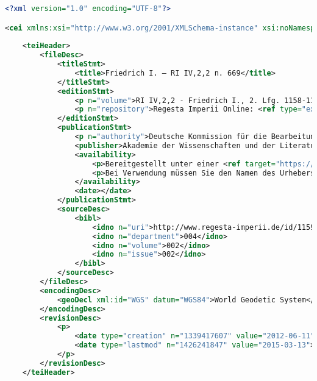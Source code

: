 \label{annexe:CEI_schema}

\lstset{style=mystyle}
\begin{lstlisting}[language=XML]
<?xml version="1.0" encoding="UTF-8"?>

<cei xmlns:xsi="http://www.w3.org/2001/XMLSchema-instance" xsi:noNamespaceSchemaLocation="http://www.cei.lmu.de/schema/cei060122.xsd">
		
	<teiHeader>
		<fileDesc>
			<titleStmt>
				<title>Friedrich I. – RI IV,2,2 n. 669</title>
			</titleStmt>
			<editionStmt>
				<p n="volume">RI IV,2,2 - Friedrich I., 2. Lfg. 1158-1168</p>
				<p n="repository">Regesta Imperii Online: <ref type="external" target="http://www.regesta-imperii.de/cei/004-002-002/sources/1159-02-15_1_0_4_2_2_111_669"></ref></p>
			</editionStmt>
			<publicationStmt>
				<p n="authority">Deutsche Kommission für die Bearbeitung der Regesta Imperii e.V. bei der Akademie der Wissenschaften und der Literatur | Mainz</p>
				<publisher>Akademie der Wissenschaften und der Literatur |Mainz – Digitale Akademie</publisher>
				<availability>
					<p>Bereitgestellt unter einer <ref target="https://creativecommons.org/licenses/by/4.0/">Creative Commons Namensnennung (CC BY 4.0)</ref></p>
					<p>Bei Verwendung müssen Sie den Namen des Urhebers und folgenden Link zum Material angeben: <ref type="external" target="http://www.regesta-imperii.de/cei/004-002-002/sources/1159-02-15_1_0_4_2_2_111_669"></ref></p>
				</availability>
				<date></date>
			</publicationStmt>
			<sourceDesc>
				<bibl>
					<idno n="uri">http://www.regesta-imperii.de/id/1159-02-15_1_0_4_2_2_111_669</idno>
					<idno n="department">004</idno>
					<idno n="volume">002</idno>
					<idno n="issue">002</idno>
				</bibl>
			</sourceDesc>
		</fileDesc>
		<encodingDesc>
			<geoDecl xml:id="WGS" datum="WGS84">World Geodetic System</geoDecl>
		</encodingDesc>
		<revisionDesc>
			<p>
				<date type="creation" n="1339417607" value="2012-06-11"></date>
				<date type="lastmod" n="1426241847" value="2015-03-13"></date>
			</p>
		</revisionDesc>
	</teiHeader>


\end{lstlisting}
